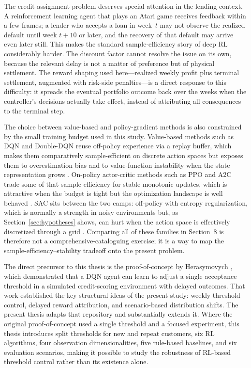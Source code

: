 \documentclass[12pt,a4paper]{article}
\begin{document}
The credit-assignment problem deserves special attention in the lending context. A reinforcement learning agent that plays an Atari game receives feedback within a few frames; a lender who accepts a loan in week~$t$ may not observe the realized default until week $t+10$ or later, and the recovery of that default may arrive even later still. This makes the standard sample-efficiency story of deep RL considerably harder. The discount factor cannot resolve the issue on its own, because the relevant delay is not a matter of preference but of physical settlement. The reward shaping used here---realized weekly profit plus terminal settlement, augmented with risk-side penalties---is a direct response to this difficulty: it spreads the eventual portfolio outcome back over the weeks when the controller's decisions actually take effect, instead of attributing all consequences to the terminal step.

The choice between value-based and policy-gradient methods is also constrained by the small training budget used in this study. Value-based methods such as DQN and Double-DQN reuse off-policy experience via a replay buffer, which makes them comparatively sample-efficient on discrete action spaces but exposes them to overestimation bias and to value-function instability when the state representation grows \cite{mnih2015dqn, van2016ddqn}. On-policy actor-critic methods such as PPO and A2C trade some of that sample efficiency for stable monotonic updates, which is attractive when the budget is tight but the optimization landscape is well behaved \cite{schulman2017ppo}. SAC sits between the two camps: off-policy with entropy regularization, which is normally a strength in noisy environments but, as Section~\ref{sec:hypotheses} shows, can hurt when the action space is effectively discretized through a grid \cite{haarnoja2018sac}. Comparing all of these families in Section~8 is therefore not a comprehensive-cataloguing exercise; it is a way to map the sample-efficiency--stability tradeoff onto the present problem.

The direct precursor to this thesis is the proof-of-concept by Herasymovych \cite{herasymovych2019}, which demonstrated that a DQN agent can learn to adjust a single acceptance threshold in a simulated credit-scoring environment with delayed outcomes. That work established the key structural ideas of the present study: weekly threshold control, delayed reward attribution, and scenario-based distribution shifts. The present thesis adapts that repository and substantially extends it. Where the original proof-of-concept used a single threshold and a focused experiment, this thesis introduces split thresholds for new and repeat customers, six RL algorithms, four observation dimensionalities, five rule-based baselines, and six evaluation scenarios, making it possible to study the robustness of RL-based threshold control rather than its existence alone.
\end{document}
